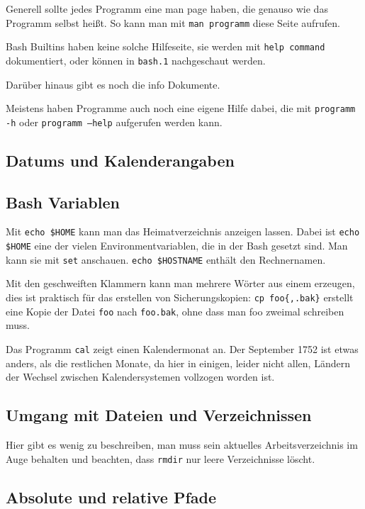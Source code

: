 \documentclass[12pt]{article}
\begin{document}
Generell sollte jedes Programm eine man page haben, die genauso wie das Programm selbst heißt. So kann man mit \texttt{man programm} diese Seite aufrufen.

Bash Builtins haben keine solche Hilfeseite, sie werden mit \texttt{help command} dokumentiert, oder können in \texttt{bash.1} nachgeschaut werden.

Darüber hinaus gibt es noch die info Dokumente.

Meistens haben Programme auch noch eine eigene Hilfe dabei, die mit \texttt{programm -h} oder \texttt{programm --help} aufgerufen werden kann.

\subsection{Datums und Kalenderangaben}

\subsection{Bash Variablen}

Mit \texttt{echo \${HOME}} kann man das Heimatverzeichnis anzeigen lassen. Dabei ist \texttt{echo \$HOME} eine der vielen Environmentvariablen, die in der Bash gesetzt sind. Man kann sie mit \texttt{set} anschauen. \texttt{echo \${HOSTNAME}} enthält den Rechnernamen.

Mit den geschweiften Klammern kann man mehrere Wörter aus einem erzeugen, dies ist praktisch für das erstellen von Sicherungskopien: \verb#cp foo{,.bak}# erstellt eine Kopie der Datei \texttt{foo} nach \texttt{foo.bak}, ohne dass man foo zweimal schreiben muss.

Das Programm \texttt{cal} zeigt einen Kalendermonat an. Der September 1752 ist etwas anders, als die restlichen Monate, da hier in einigen, leider nicht allen, Ländern der Wechsel zwischen Kalendersystemen vollzogen worden ist.

\subsection{Umgang mit Dateien und Verzeichnissen}

Hier gibt es wenig zu beschreiben, man muss sein aktuelles Arbeitsverzeichnis im Auge behalten und beachten, dass \texttt{rmdir} nur leere Verzeichnisse löscht.

\subsection{Absolute und relative Pfade}
\end{document}
